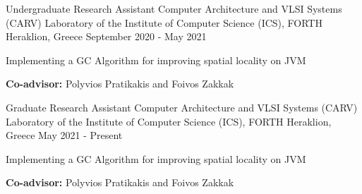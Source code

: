 

\begin{cventries}


  \cventry
    {Undergraduate Research Assistant} %
    {Computer Architecture and VLSI Systems (CARV) Laboratory of the Institute of Computer Science (ICS), FORTH} %
    {Heraklion, Greece} %
    {September 2020 - May 2021} %
    {
      \begin{cvitems} %
        \item {Implementing a GC Algorithm for improving spatial locality on JVM}
        \item{\textbf{Co-advisor:} Polyvios Pratikakis and Foivos Zakkak}
      \end{cvitems}
    }
  \cventry
    {Graduate Research Assistant} %
    {Computer Architecture and VLSI Systems (CARV) Laboratory of the Institute of Computer Science (ICS), FORTH} %
    {Heraklion, Greece} %
    {May 2021 - Present} %
    {
      \begin{cvitems} %
        \item {Implementing a GC Algorithm for improving spatial locality on JVM}
        \item{\textbf{Co-advisor:} Polyvios Pratikakis and Foivos Zakkak}
      \end{cvitems}
    }
\end{cventries}
